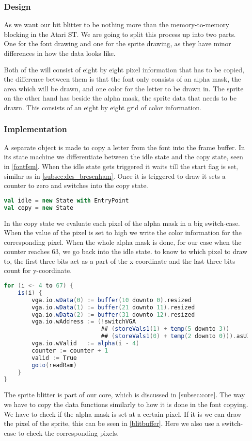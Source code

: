 \subsubsection*{Design}
As we want our bit blitter to be nothing more than the memory-to-memory blocking in the Atari ST. We are going to split this process up into two parts. One for the font drawing and one for the sprite drawing, as they have minor differences in how the data looks like.

Both of the will consist of eight by eight pixel information that has to be copied, the difference between them is that the font only consists of an alpha mask, the area which will be drawn, and one color for the letter to be drawn in. The sprite on the other hand has beside the alpha mask, the sprite data that needs to be drawn. This consists of an eight by eight grid of color information. 

\subsubsection*{Implementation}
A separate object is made to copy a letter from the font into the frame buffer. In its state machine we differentiate between the idle state and the copy state, seen in \cref{fontfsm}. When the idle state gets triggered it waits till the start flag is set, similar as in \cref{subsec:des_bresenham}. Once it is triggered to draw it sets a counter to zero and switches into the copy state.
\begin{lstlisting}[language=scala, caption={States of the Font Blitter}, label=fontfsm]
val idle = new State with EntryPoint
val copy = new State
\end{lstlisting}
In the copy state we evaluate each pixel of the alpha mask in a big switch-case. When the value of the pixel is set to high we write the color information for the corresponding pixel. When the whole alpha mask is done, for our case when the counter reaches 63, we go back into the idle state.
to know to which pixel to draw to, the first three bits act as a part of the x-coordinate and the last three bits count for y-coordinate.
\begin{lstlisting}[language=scala, caption={Copying the sprite color information into the frame buffer}, label={blitbuffer}]
for (i <- 4 to 67) {
	is(i) {
		vga.io.wData(0) := buffer(10 downto 0).resized
		vga.io.wData(1) := buffer(21 downto 11).resized
		vga.io.wData(2) := buffer(31 downto 12).resized
		vga.io.wAddress := (!switchVGA 
				  			## (storeVals1(1) + temp(5 downto 3)) 
				  			## (storeVals1(0) + temp(2 downto 0))).asUInt
		vga.io.wValid   := alpha(i - 4)
		counter := counter + 1
		valid := True
		goto(readRam)
	}
}
\end{lstlisting}
The sprite blitter is part of our core, which is discussed in \cref{subsec:core}. The way we have to copy the data functions similarly to how it is done in the font copying. We have to check if the alpha mask is set at a certain pixel. If it is we can draw the pixel of the sprite, this can be seen in \cref{blitbuffer}. Here we also use a switch-case to check the corresponding pixels.
